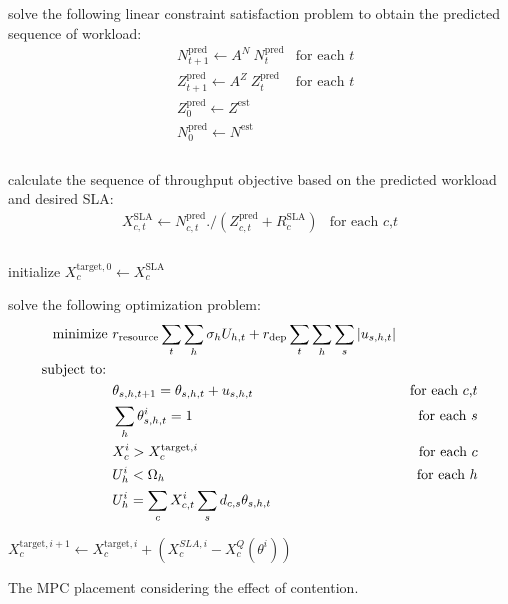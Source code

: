   \begin{spacing}{1} 
 \begin{algorithm}
        \small
        \SetAlgoVlined
  \SetAlFnt{\tiny}


\BlankLine

solve the following linear constraint satisfaction problem to obtain the predicted sequence of workload:
 \begin{align*}
   & N^{\text{pred}}_{t+1} \gets A^N\ N^{\text{pred}}_t & \text{for each $t$}   \nonumber \\ 
  & Z^{\text{pred}}_{t+1} \gets A^Z\ Z^{\text{pred}}_t & \text{for each $t$}  \nonumber \\ 
  & Z^{\text{pred}}_{0} \gets Z^{\text{est}} \\ 
  & N^{\text{pred}}_{0} \gets N^{\text{est}} \\ 
 \end{align*} \\
 calculate the sequence of throughput objective based on the predicted workload and desired SLA: 
 \begin{align*}
  X_{c,t}^\text{SLA}\gets N^{\text{pred}}_{c,t} ./ (Z^{\text{pred}}_{c,t} + R_{c}^\text{SLA})  & \text{for each $c$,$t$}  \\     
 \end{align*} \\
initialize $X_c^{\text{target},0} \gets X_c^\text{SLA}$ \\ 

{
solve the following optimization problem: 
 \begin{align*}
 \text{minimize } & r_{\text{resource}} \sum_t \sum_{h} \sigma_{h} U_{h,t} + r_{\text{dep}}  \sum_t \sum_{h}  \sum_{s} |u_{s,h,t} |  \\
 \text{subject to: } \\ 
   & \theta_{s,h,t+1} = \theta_{s,h,t} +  u_{s,h,t}  & \text{for each $c$,$t$}  \nonumber \\
 & \sum_h \theta_{s,h,t}^i = 1 & \text{for each $s$} \nonumber \\ 
 & X_c^i>X_{c}^{\text{target},i}   & \text{for each $c$} \nonumber \\
 & U_h^i < \Omega_{h} & \text{for each $h$} \nonumber \\ 
 & U_h^i = \sum_c X_{c,t}^{i} \sum_s d_{c,s} \theta_{s,h,t}  \nonumber
 \end{align*} 
 
  $ X_c^{\text{target},i+1} \gets X_c^{\text{target},i} + (X_c^{SLA,i} - X^Q_c(\theta^i) ) $ \\ 
}

\caption{The MPC placement considering the effect of contention.}
\label{contention-mpc-algorithm1}
\end{algorithm}
\end{spacing}   
	
